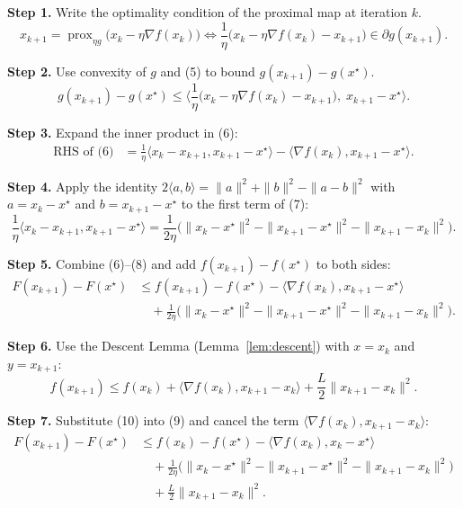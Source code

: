 \documentclass{article}
\newcommand{\prox}{\operatorname{prox}}
\begin{document}
\noindent\textbf{Step 1.} Write the optimality condition of the proximal map at iteration $k$.
\[
x_{k+1}= \prox_{\eta g}\!\bigl(x_{k}-\eta\nabla f(x_{k})\bigr)
\Longleftrightarrow
\frac{1}{\eta}\bigl(x_{k}-\eta\nabla f(x_{k})-x_{k+1}\bigr)\in\partial g(x_{k+1}).
\tag{5}
\]

\noindent\textbf{Step 2.} Use convexity of $g$ and (5) to bound $g(x_{k+1})-g(x^{\star})$.
\[
g(x_{k+1})-g(x^{\star})
\le \Big\langle\frac{1}{\eta}\bigl(x_{k}-\eta\nabla f(x_{k})-x_{k+1}\bigr),\;x_{k+1}-x^{\star}\Big\rangle .
\tag{6}
\]

\noindent\textbf{Step 3.} Expand the inner product in (6):
\[
\begin{aligned}
\text{RHS of (6)} 
&= \frac{1}{\eta}\langle x_{k}-x_{k+1},x_{k+1}-x^{\star}\rangle
      -\langle \nabla f(x_{k}),x_{k+1}-x^{\star}\rangle .
\end{aligned}
\tag{7}
\]

\noindent\textbf{Step 4.} Apply the identity $2\langle a,b\rangle =\|a\|^{2}+\|b\|^{2}-\|a-b\|^{2}$ with
$a=x_{k}-x^{\star}$ and $b=x_{k+1}-x^{\star}$ to the first term of (7):
\[
\frac{1}{\eta}\langle x_{k}-x_{k+1},x_{k+1}-x^{\star}\rangle
= \frac{1}{2\eta}\bigl(\|x_{k}-x^{\star}\|^{2}
                     -\|x_{k+1}-x^{\star}\|^{2}
                     -\|x_{k+1}-x_{k}\|^{2}\bigr).
\tag{8}
\]

\noindent\textbf{Step 5.} Combine (6)–(8) and add $f(x_{k+1})-f(x^{\star})$ to both sides:
\[
\begin{aligned}
F(x_{k+1})-F(x^{\star})
&\le f(x_{k+1})-f(x^{\star})
   -\langle \nabla f(x_{k}),x_{k+1}-x^{\star}\rangle \\
&\quad +\frac{1}{2\eta}\bigl(\|x_{k}-x^{\star}\|^{2}
                     -\|x_{k+1}-x^{\star}\|^{2}
                     -\|x_{k+1}-x_{k}\|^{2}\bigr).
\end{aligned}
\tag{9}
\]

\noindent\textbf{Step 6.} Use the Descent Lemma (Lemma~\ref{lem:descent}) with $x=x_{k}$ and $y=x_{k+1}$:
\[
f(x_{k+1})\le f(x_{k})+\langle\nabla f(x_{k}),x_{k+1}-x_{k}\rangle
            +\frac{L}{2}\|x_{k+1}-x_{k}\|^{2}.
\tag{10}
\]

\noindent\textbf{Step 7.} Substitute (10) into (9) and cancel the term $\langle\nabla f(x_{k}),x_{k+1}-x_{k}\rangle$:
\[
\begin{aligned}
F(x_{k+1})-F(x^{\star})
&\le f(x_{k})-f(x^{\star})
   -\langle \nabla f(x_{k}),x_{k}-x^{\star}\rangle \\
&\quad +\frac{1}{2\eta}\bigl(\|x_{k}-x^{\star}\|^{2}
                     -\|x_{k+1}-x^{\star}\|^{2}
                     -\|x_{k+1}-x_{k}\|^{2}\bigr) \\
&\quad +\frac{L}{2}\|x_{k+1}-x_{k}\|^{2}.
\end{aligned}
\tag{11}
\]
\end{document}
